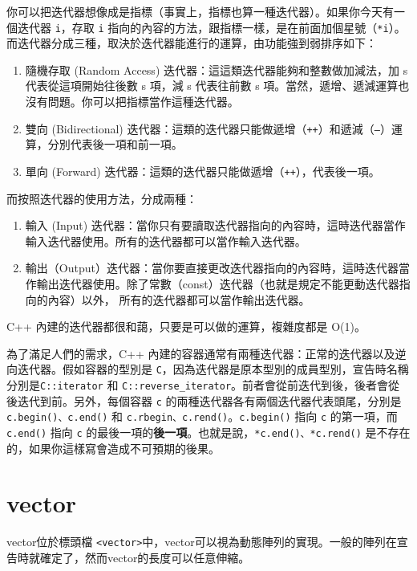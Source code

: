 \documentclass[a4paper, 11pt, oneside]{book}
\begin{document}
你可以把迭代器想像成是指標（事實上，指標也算一種迭代器）。如果你今天有一個迭代器 \texttt{i}，存取 \texttt{i} 指向的內容的方法，跟指標一樣，是在前面加個星號（\texttt{*i}）。而迭代器分成三種，取決於迭代器能進行的運算，由功能強到弱排序如下：
\begin{enumerate}
    \item 隨機存取 (Random Access) 迭代器：這這類迭代器能夠和整數做加減法，加 s 代表從這項開始往後數 s 項，減 s 代表往前數 s 項。當然，遞增、遞減運算也沒有問題。你可以把指標當作這種迭代器。
    
    \item 雙向 (Bidirectional) 迭代器：這類的迭代器只能做遞增（\texttt{++}）和遞減（\texttt{--}）運算，分別代表後一項和前一項。
    \item 單向 (Forward) 迭代器：這類的迭代器只能做遞增（\texttt{++}），代表後一項。
\end{enumerate}

而按照迭代器的使用方法，分成兩種：
\begin{enumerate}
    \item 輸入 (Input) 迭代器：當你只有要讀取迭代器指向的內容時，這時迭代器當作輸入迭代器使用。所有的迭代器都可以當作輸入迭代器。
    \item 輸出（Output）迭代器：當你要直接更改迭代器指向的內容時，這時迭代器當作輸出迭代器使用。除了常數（const）迭代器（也就是規定不能更動迭代器指向的內容）以外， 所有的迭代器都可以當作輸出迭代器。    
\end{enumerate}

C++ 內建的迭代器都很和藹，只要是可以做的運算，複雜度都是 O(1)。

為了滿足人們的需求，C++ 內建的容器通常有兩種迭代器：正常的迭代器以及逆向迭代器。假如容器的型別是 \texttt{C}，因為迭代器是原本型別的成員型別，宣告時名稱分別是\texttt{C::iterator} 和 \texttt{C::reverse\_iterator}。前者會從前迭代到後，後者會從後迭代到前。另外，每個容器 \texttt{c} 的兩種迭代器各有兩個迭代器代表頭尾，分別是\texttt{c.begin()、c.end()} 和 \texttt{c.rbegin、c.rend()}。\texttt{c.begin()} 指向 \texttt{c} 的第一項，而 \texttt{c.end()} 指向 \texttt{c} 的最後一項的\textbf{後一項}。也就是說，\texttt{*c.end()、*c.rend()} 是不存在的，如果你這樣寫會造成不可預期的後果。

\section{vector}

vector位於標頭檔 \texttt{<vector>}中，vector可以視為動態陣列的實現。一般的陣列在宣告時就確定了，然而vector的長度可以任意伸縮。
\end{document}
